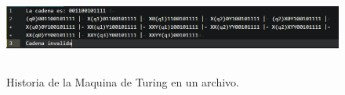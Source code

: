 	\begin{figure}[H]
		\begin{center}
			\includegraphics[width=16cm, height=3cm]{img/turing-automatico-archivo.png}
			\caption{Historia de la Maquina de Turing en un archivo.}
			\label{fig:turing4}
		\end{center}
	\end{figure}
